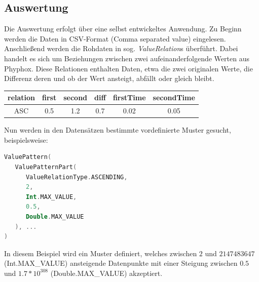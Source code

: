 \documentclass{article}
\begin{document}
\begin{multicols*}{3}
   \section*{Auswertung}
   Die Auswertung erfolgt über eine selbst entwickeltes Anwendung. Zu Beginn werden die Daten in CSV-Format (Comma separated value) eingelesen.\\
   Anschließend werden die Rohdaten in sog. \emph{ValueRelation}s überführt. Dabei handelt es sich um Beziehungen zwischen zwei aufeinanderfolgende Werten aus Phyphox.
   Diese Relationen enthalten Daten, etwa die zwei originalen Werte, die Differenz deren und ob der Wert ansteigt, abfällt oder gleich bleibt.\\
   \begin{center}
      \captionsetup{justification=centering}
      \begin{tabular}{ |c | c | c | c | c | c | }
         \hline
         relation & first & second & diff & firstTime & secondTime \\
         \hline
         ASC      & 0.5   & 1.2    & 0.7  & 0.02      & 0.05       \\
         \hline
      \end{tabular}
      \label{fig:sample_ValueRelation}
   \end{center}
   Nun werden in den Datensätzen bestimmte vordefinierte Muster gesucht, beispielsweise:\\
   \begin{lstlisting}[language=Kotlin]
ValuePattern(
   ValuePatternPart(
      ValueRelationType.ASCENDING,
      2,
      Int.MAX_VALUE,
      0.5,
      Double.MAX_VALUE
   ), ...
)
        \end{lstlisting}
   In diesem Beispiel wird ein Muster definiert, welches zwischen $2$ und $2147483647$ (Int.MAX\_VALUE) ansteigende Datenpunkte
   mit einer Steigung zwischen $0.5$ und $1.7*10^{308}$ (Double.MAX\_VALUE) akzeptiert.\\
   \begin{center}
      \captionsetup{justification=centering}
      \label{fig:sample_graphs}
   \end{center}
   \vfill\null
   \columnbreak

\end{multicols*}
\end{document}
